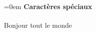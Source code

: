 \documentclass{article}
\begin{document}
\parindent=0em
\textbf{Caractères spéciaux} \\ \\
Bonjour tout le monde
\end{document}
